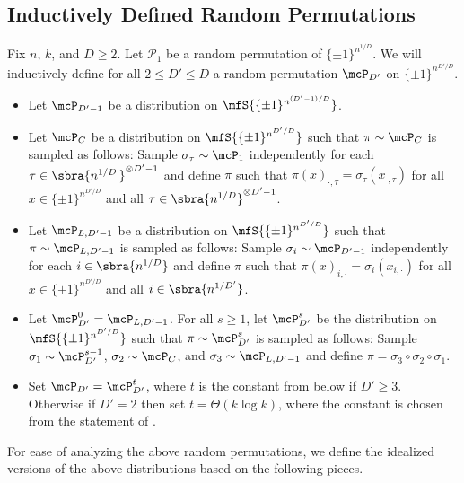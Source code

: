 \subsection{Inductively Defined Random Permutations}\label{sec:defs higher dim}
Fix $n$, $k$, and $D\geq 2$. Let $\mathcal{P}_1$ be a random permutation of $\{\pm1\}^{n^{1/D}}$. We will inductively define for all $2 \leq D'\leq D$ a random permutation $\mcP_{D'}$ on $\{\pm1\}^{n^{D'/D}}$.
\begin{itemize}
    \item Let $\mcP_{D'-1}$ be a distribution on $\mfS{\{\pm1\}^{n^{(D'-1)/D}}}$. 
    \item Let $\mcP_C$ be a distribution on $\mfS{\{\pm1\}^{n^{D'/D}}}$ such that $\pi \sim \mcP_C$ is sampled as follows: 
          Sample $\sigma_\tau \sim \mcP_1$ independently for each $\tau \in \sbra{n^{1/D}\,}^{\otimes D'-1}$ and define $\pi$ such that $\pi(x)_{\cdot, \tau} = \sigma_\tau(x_{\cdot, \tau})$ for all $x \in \{\pm1\}^{n^{D'/D}}$ and all $\tau \in \sbra{n^{1/D}}^{\otimes D'-1}$. 
    \item Let $\mcP_{L,D'-1}$ be a distribution on $\mfS{\{\pm1\}^{n^{D'/D}}}$ such that $\pi \sim \mcP_{L, D'-1}$ is sampled as follows: 
          Sample $\sigma_i \sim \mcP_{D'-1}$ independently for each $i \in \sbra{n^{1/D}}$ and define $\pi$ such that $\pi(x)_{i, \cdot} = \sigma_i(x_{i, \cdot})$ for all $x \in \{\pm1\}^{n^{D'/D}}$ and all $i \in \sbra{n^{1/D'}}$. 
    \item Let $\mcP^0_{D'} = \mcP_{L,D'-1}$. For all $s \ge 1$, let $\mcP_{D'}^{s}$ be the distribution on $\mfS{\{\pm1\}^{n^{D'/D}}}$ such that $\pi \sim \mcP^{s}_{D'}$ is sampled as follows:
          Sample $\sigma_1 \sim \mcP_{D'}^{s-1}$, $\sigma_2 \sim \mcP_{C}$, and $\sigma_3 \sim \mcP_{L,D'-1}$ and define $\pi=\sigma_3 \circ \sigma_2 \circ \sigma_1$.
    \item Set $\mcP_{D'} = \mcP_{D'}^t$, where $t$ is the constant from  below if $D'\geq 3$. Otherwise if $D'=2$ then set $t=\Theta(k\log k)$, where the constant is chosen from the statement of .
\end{itemize}
For ease of analyzing the above random permutations, we define the idealized versions of the above distributions based on the following pieces.
